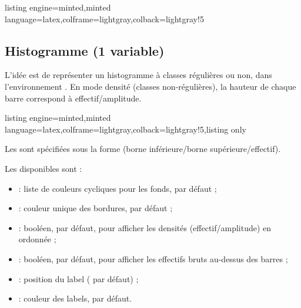 \documentclass[11pt,a4paper]{ltxdoc}
\begin{document}
\begin{tcblisting}{listing engine=minted,minted language=latex,colframe=lightgray,colback=lightgray!5}
\begin{GraphiqueTikz}%
  [x=1.2cm,y=0.4cm,Xmin=0,Xmax=7,Xgrille=1,Ymin=0,Ymax=15,Ygrille=5,Ygrilles=1]
\end{GraphiqueTikz}
\end{tcblisting}

\pagebreak

\subsection{Histogramme (1 variable)}\label{histogramme}

L'idée est de représenter un histogramme à classes régulières ou non, dans l'environnement . En mode densité (classes non-régulières), la hauteur de chaque barre correspond à effectif/amplitude.

\begin{tcblisting}{listing engine=minted,minted language=latex,colframe=lightgray,colback=lightgray!5,listing only}
\end{tcblisting}

Les  sont spécifiées sous la forme  (borne inférieure/borne supérieure/effectif).

\smallskip

Les \MontreCode{[clés]} disponibles sont :

\begin{itemize}
  \item {} : liste de couleurs cycliques pour les fonds,  par défaut ;
  \item {} : couleur unique des bordures,  par défaut ;
  \item {} : booléen,  par défaut, pour afficher les densités (effectif/amplitude) en ordonnée ;
  \item {} : booléen,  par défaut, pour afficher les effectifs bruts au-dessus des barres ;
  \item {} : position du label ( par défaut) ;
  \item {} : couleur des labels,  par défaut.
\end{itemize}
\end{document}

